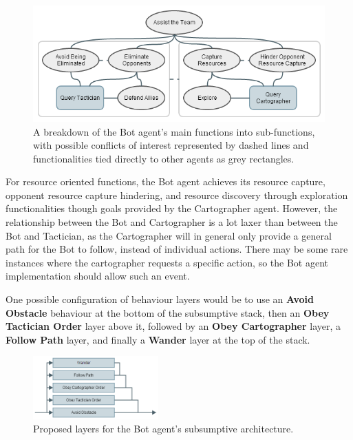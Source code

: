 \documentclass[a4paper,10pt]{article}
\begin{document}
\begin{figure}[!ht]
  \centering
  \includegraphics[width=0.8\linewidth]{bot}
  \begin{minipage}[t]{0.8\textwidth}
    \caption{A breakdown of the Bot agent's main functions into sub-functions, with possible conflicts of interest represented by dashed lines and functionalities tied directly to other agents as grey rectangles.}
  \end{minipage}
\end{figure}

For resource oriented functions, the Bot agent achieves its resource capture, opponent resource capture hindering, and resource discovery through exploration functionalities though goals provided by the Cartographer agent. However, the relationship between the Bot and Cartographer is a lot laxer than between the Bot and Tactician, as the Cartographer will in general only provide a general path for the Bot to follow, instead of individual actions. There may be some rare instances where the cartographer requests a specific action, so the Bot agent implementation should allow such an event.

One possible configuration of behaviour layers would be to use an \textbf{Avoid Obstacle} behaviour at the bottom of the subsumptive stack, then an \textbf{Obey Tactician Order} layer above it, followed by an \textbf{Obey Cartographer} layer, a \textbf{Follow Path} layer, and finally a \textbf{Wander} layer at the top of the stack.

\begin{figure}
  \vspace{-5mm}
  \begin{center}
    \includegraphics[width=0.43\textwidth]{subsumptive}
    \caption{Proposed layers for the Bot agent's subsumptive architecture.}
  \end{center}
  \vspace{-5mm}
\end{figure}
\end{document}
